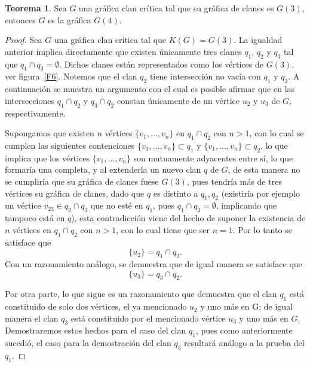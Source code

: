 \documentclass[12pt]{book}
\theoremstyle{definition}
\newtheorem{theorem}{Teorema}[chapter]
\begin{document}
\begin{theorem}\label{T1.12}
Sea $G$ una gráfica clan crítica tal que su gráfica de clanes es $G(3)$, entonces $G$ es la gráfica $G(4)$.
\end{theorem}

\begin{proof}
Sea $G$ una gráfica clan crítica tal que $K(G)=G(3)$. La igualdad anterior implica directamente que existen únicamente tres clanes $q_1$, $q_2$ y $q_3$ tal que $q_1\cap q_3=\emptyset$. Dichos clanes están representados como los vértices de $G(3)$, ver figura~\ref{F6}.
Notemos que el clan $q_2$ tiene intersección no vacía con $q_1$ y $q_3$. A continuación se muestra un argumento con el cual es posible afirmar que en las intersecciones $q_1\cap q_2$ y $q_3\cap q_2$ constan únicamente de un vértice $u_2$ y $u_3$ de $G$, respectivamente.

Supongamos que existen $n$ vértices $\{v_1,\dots,v_n\}$ en $q_1\cap q_2$ con $n>1$, con lo cual se cumplen las siguientes contenciones $\{v_1,\dots,v_n\}\subset q_1 $ y $\{v_1,\dots,v_n\}\subset q_2$, lo que implica que los vértices $\{v_1,\dots,v_n\}$ son mutuamente adyacentes entre sí, lo que formaría una completa, y al extenderla un nuevo clan $q$ de $G$, de esta manera no se cumpliría que su gráfica de clanes fuese $G(3)$, pues tendría más de tres vértices su gráfica de clanes, dado que $q$ es distinto a $q_{1},q_{2}$ (existiría por ejemplo un vértice $v_{23}\in q_2\cap q_3$ que no esté en $q_1$, pues $q_1\cap q_3=\emptyset$, implicando que tampoco está en $q$), esta contradicción viene del hecho de suponer la existencia de $n$ vértices en $q_1\cap q_2$ con $n>1$, con lo cual tiene que ser $n=1$. Por lo tanto se satisface que 
\begin{equation*}
\{u_2\}=q_1\cap q_2.
\end{equation*}
Con un razonamiento análogo, se demuestra que de igual manera se satisface que 
\begin{equation*}
	\{u_3\}=q_3\cap q_2.
\end{equation*}

Por otra parte, lo que sigue es un razonamiento que demuestra que el clan $q_1$ está constituido de solo dos vértices, el ya mencionado $u_2$ y uno más en G; de igual manera el clan $q_3$ está constituido por el mencionado vértice $u_3$ y uno más en $G$. Demostraremos estos hechos para el caso del clan $q_1$, pues como anteriormente sucedió, el caso para la demostración del clan $q_3$ resultará análogo a la prueba del $q_1$. 



\end{proof}
\end{document}

